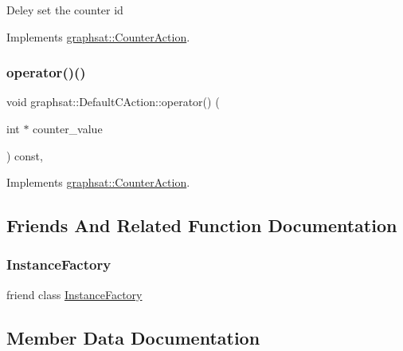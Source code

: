 Deley set the counter id 

Implements \mbox{\hyperlink{classgraphsat_1_1_counter_action_a09e8a5779f0ae70ea07e8974d93edf2e}{graphsat\+::\+Counter\+Action}}.

\mbox{\label{classgraphsat_1_1_default_c_action_a78b8f5f344c61e83c83fca04be2a4d73}} 
\subsubsection{\texorpdfstring{operator()()}{operator()()}}
{\footnotesize\ttfamily void graphsat\+::\+Default\+C\+Action\+::operator() (\begin{DoxyParamCaption}\item[{int $\ast$}]{counter\+\_\+value }\end{DoxyParamCaption}) const\hspace{0.3cm}{\ttfamily [inline]}, {\ttfamily [virtual]}}



Implements \mbox{\hyperlink{classgraphsat_1_1_counter_action_ac21660dc667a4abca69fdda313c6708c}{graphsat\+::\+Counter\+Action}}.



\subsection{Friends And Related Function Documentation}
\mbox{\label{classgraphsat_1_1_default_c_action_ad4b3c25c041701ae56dc1e78df779d2f}} 
\subsubsection{\texorpdfstring{InstanceFactory}{InstanceFactory}}
{\footnotesize\ttfamily friend class \mbox{\hyperlink{classgraphsat_1_1_instance_factory}{Instance\+Factory}}\hspace{0.3cm}{\ttfamily [friend]}}



\subsection{Member Data Documentation}
\mbox{\label{classgraphsat_1_1_default_c_action_aac5f877175ded69616afb1ff2812562b}} 
